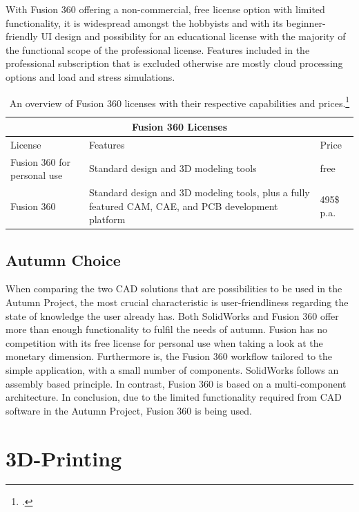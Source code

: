 With Fusion 360 offering a non-commercial, free license option with limited functionality, it is widespread amongst the hobbyists and with its beginner-friendly UI design and possibility for an educational license with the majority of the functional scope of the professional license. Features included in the professional subscription that is excluded otherwise are mostly cloud processing options and load and stress simulations.

\begin{table}
	\centering
	\begin{tabular}{ |p{3cm}||p{6cm}|p{3cm}|  }
		\hline
		\multicolumn{3}{|c|}{Fusion 360 Licenses} \\
		\hline
		License & Features & Price\\
		\hline
		Fusion 360 for personal use& Standard design and 3D modeling tools& free\\
		\hline
		Fusion 360& Standard design and 3D modeling tools, plus a fully featured CAM, CAE, and PCB development platform& 495\$ p.a.\\
		\hline
	\end{tabular}
	\caption{An overview of Fusion 360 licenses with their respective capabilities and prices.\footcite{autodeskFusionPersonalNoDate}}
\end{table}

\subsection{Autumn Choice}
When comparing the two CAD solutions that are possibilities to be used in the Autumn Project, the most crucial characteristic is user-friendliness regarding the state of knowledge the user already has. Both SolidWorks and Fusion 360 offer more than enough functionality to fulfil the needs of autumn. Fusion has no competition with its free license for personal use when taking a look at the monetary dimension. Furthermore is, the Fusion 360 workflow tailored to the simple application, with a small number of components. SolidWorks follows an assembly based principle. In contrast, Fusion 360 is based on a multi-component architecture.\newline
In conclusion, due to the limited functionality required from CAD software in the Autumn Project, Fusion 360 is being used.

\section{3D-Printing}

